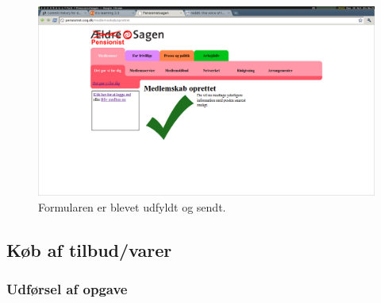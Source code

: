 \begin{figure}[h]
    \centering
    \includegraphics[width=.95\textwidth]{billeder/opgave1_trin4.png}
    \caption{Formularen er blevet udfyldt og sendt.}
    \label{fig:opg1_trin4}
\end{figure}

\subsection{Køb af tilbud/varer}

\subsubsection{Udførsel af opgave}

